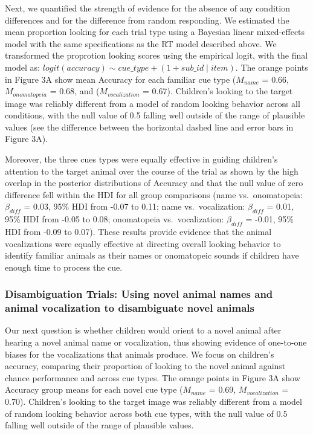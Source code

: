 \documentclass[english,floatsintext,man]{apa6}
\theoremstyle{definition}
\theoremstyle{definition}
\theoremstyle{definition}
\theoremstyle{remark}
\begin{document}
Next, we quantified the strength of evidence for the absence of any
condition differences and for the difference from random responding. We
estimated the mean proportion looking for each trial type using a
Bayesian linear mixed-effects model with the same specifications as the
RT model described above. We transformed the proprotion looking scores
using the empirical logit, with the final model as:
\(logit(accuracy) \sim cue\_type + (1 + sub\_id \mid item)\). The orange
points in Figure 3A show mean Accuracy for each familiar cue type
(\(M_{name}\) = 0.66, \(M_{onomatopeia}\) = 0.68, and
(\(M_{vocalization}\) = 0.67). Children's looking to the target image
was reliably different from a model of random looking behavior across
all conditions, with the null value of 0.5 falling well outside of the
range of plausible values (see the difference between the horizontal
dashed line and error bars in Figure 3A).

Moreover, the three cues types were equally effective in guiding
children's attention to the target animal over the course of the trial
as shown by the high overlap in the posterior distributions of Accuracy
and that the null value of zero difference fell within the HDI for all
group comparisons (name vs.~onomatopeia: \(\beta_{diff}\) = 0.03, 95\%
HDI from -0.07 to 0.11; name vs.~vocalization: \(\beta_{diff}\) = 0.01,
95\% HDI from -0.05 to 0.08; onomatopeia vs.~vocalization:
\(\beta_{diff}\) = -0.01, 95\% HDI from -0.09 to 0.07). These results
provide evidence that the animal vocalizations were equally effective at
directing overall looking behavior to identify familiar animals as their
names or onomatopeic sounds if children have enough time to process the
cue.

\hypertarget{disambiguation-trials-using-novel-animal-names-and-animal-vocalization-to-disambiguate-novel-animals}{%
\subsubsection{Disambiguation Trials: Using novel animal names and
animal vocalization to disambiguate novel
animals}\label{disambiguation-trials-using-novel-animal-names-and-animal-vocalization-to-disambiguate-novel-animals}}

Our next question is whether children would orient to a novel animal
after hearing a novel animal name or vocalization, thus showing evidence
of one-to-one biases for the vocalizations that animals produce. We
focus on children's accuracy, comparing their proportion of looking to
the novel animal against chance performance and across cue types. The
orange points in Figure 3A show Accuracy group means for each novel cue
type (\(M_{name}\) = 0.69, \(M_{vocalization}\) = 0.70). Children's
looking to the target image was reliably different from a model of
random looking behavior across both cue types, with the null value of
\(0.5\) falling well outside of the range of plausible values.
\end{document}
